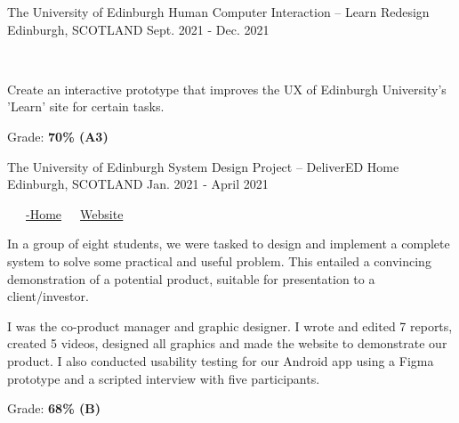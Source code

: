 \begin{cventries}
  \cventry
    {The University of Edinburgh} %
    {Human Computer Interaction -- Learn Redesign} %
    {Edinburgh, SCOTLAND} %
    {Sept. 2021 - Dec. 2021} %
    {
      \color{awesome}\color{graytext}\ \ \ \href{https://www.figma.com/proto/Q6wnTtZs5rP21QqnWcJBP6/G42-CW3?node-id=0\%3A1}{\faFigma\acvHeaderIconSep\@Prototype}
      \vspace{1.6em}
      \begin{cvitems} %
        \item Create an interactive prototype that improves the UX of Edinburgh University's 'Learn' site for certain tasks.
        \item Grade: \textbf{70\% (A3)}
      \end{cvitems}
    }
    
  \cventry
    {The University of Edinburgh} %
    {System Design Project -- DeliverED Home} %
    {Edinburgh, SCOTLAND} %
    {Jan. 2021 - April 2021} %
    {
      \color{awesome}     \color{graytext}\ \ \ \href{https://github.com/DeliverED-Home}{\faGithub\acvHeaderIconSep\@DeliverED-Home}\ \ \ \href{https://DeliverED-Home.github.io/DeliverED-Site}{\faGlobe\acvHeaderIconSep\@Product Website}
      \vspace{1.6em}
      \begin{cvitems} %
        \item In a group of eight students, we were tasked to design and implement a complete system to solve some practical and useful problem. This entailed a convincing demonstration of a potential product, suitable for presentation to a client/investor.
        \item I was the co-product manager and graphic designer. I wrote and edited 7 reports, created 5 videos, designed all graphics and made the website to demonstrate our product. I also conducted usability testing for our Android app using a Figma prototype and a scripted interview with five participants.
        \item Grade: \textbf{68\% (B)}
      \end{cvitems}
    }
    

\end{cventries}
